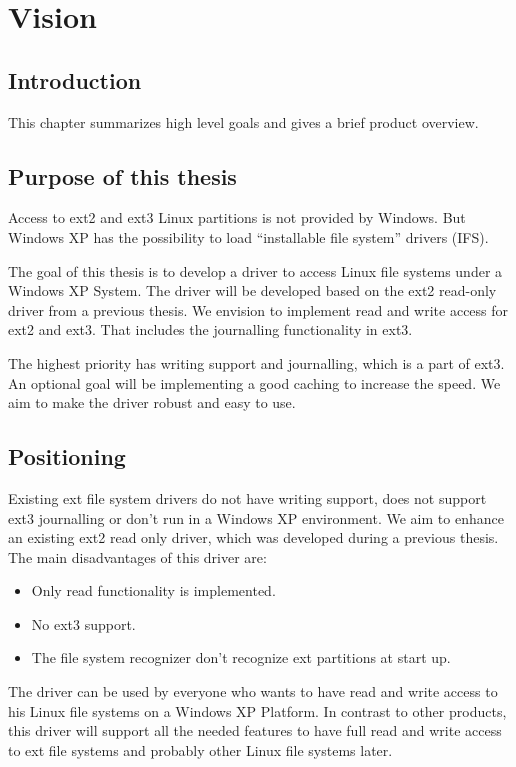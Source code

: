 \chapter{Vision}
\label{cha:Vision}

\section{Introduction}
This chapter summarizes high level goals and gives a brief product overview.

\section{Purpose of this thesis}
Access to ext2 and ext3 Linux partitions is not provided by Windows. But Windows XP has the possibility to load ``installable file system'' drivers (IFS).

The goal of this thesis is to develop a driver to access Linux file systems under a Windows XP System. The driver will be developed based on the ext2 read-only driver from a previous thesis. We envision to implement read and write access for ext2 and ext3. That includes the journalling functionality in ext3. 

The highest priority has writing support and journalling, which is a part of ext3. An optional goal will be implementing a good caching to increase the speed. We aim to make the driver robust and easy to use.

\section{Positioning}
Existing ext file system drivers do not have writing support, does not support ext3 journalling or don't run in a Windows XP environment. We aim to enhance an existing ext2 read only driver, which was developed during a previous thesis. The main disadvantages of this driver are:
\begin{itemize}
\item Only read functionality is implemented.
\item No ext3 support.
\item The file system recognizer don't recognize ext partitions at start up.
\end{itemize}

The driver can be used by everyone who wants to have read and write access to his Linux file systems on a Windows XP Platform. In contrast to other products, this driver will support all the needed features to have full read and write access to ext file systems and probably other Linux file systems later.

